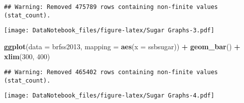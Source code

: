 \documentclass[]{article}
\newenvironment{Shaded}{\begin{snugshade}}{\end{snugshade}}
\newcommand{\KeywordTok}[1]{\textcolor[rgb]{0.13,0.29,0.53}{\textbf{#1}}}
\newcommand{\DataTypeTok}[1]{\textcolor[rgb]{0.13,0.29,0.53}{#1}}
\newcommand{\DecValTok}[1]{\textcolor[rgb]{0.00,0.00,0.81}{#1}}
\newcommand{\StringTok}[1]{\textcolor[rgb]{0.31,0.60,0.02}{#1}}
\newcommand{\OtherTok}[1]{\textcolor[rgb]{0.56,0.35,0.01}{#1}}
\newcommand{\OperatorTok}[1]{\textcolor[rgb]{0.81,0.36,0.00}{\textbf{#1}}}
\newcommand{\NormalTok}[1]{#1}
\begin{document}
\begin{verbatim}
## Warning: Removed 475789 rows containing non-finite values (stat_count).
\end{verbatim}

\texttt{[image: DataNotebook\_files/figure-latex/Sugar Graphs-3.pdf]}

\begin{Shaded}
\begin{Highlighting}[]
\KeywordTok{ggplot}\NormalTok{(}\DataTypeTok{data =}\NormalTok{ brfss2013, }\DataTypeTok{mapping =} \KeywordTok{aes}\NormalTok{(}\DataTypeTok{x =}\NormalTok{ ssbsugar)) }\OperatorTok{+}\StringTok{ }\KeywordTok{geom_bar}\NormalTok{() }\OperatorTok{+}\StringTok{ }\KeywordTok{xlim}\NormalTok{(}\DecValTok{300}\NormalTok{, }\DecValTok{400}\NormalTok{)}
\end{Highlighting}
\end{Shaded}

\begin{verbatim}
## Warning: Removed 465402 rows containing non-finite values (stat_count).
\end{verbatim}

\texttt{[image: DataNotebook\_files/figure-latex/Sugar Graphs-4.pdf]}

\begin{Shaded}
\end{Shaded}

\begin{Shaded}
\end{Shaded}
\end{document}
